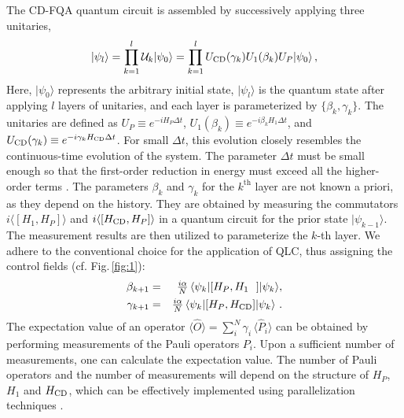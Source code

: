 \documentclass[twocolumn,aps,superscriptaddress,floatfix,longbibliography]{revtex4-2}
\newcommand{\la}{\langle}
\newcommand{\ra}{\rangle}
\newcommand{\awc}[1]{{\color[rgb]{.8,.6,.6}{[AW: {\it #1}\,]}}}
\newcommand{\Fig}[1]{Fig.\,\ref{fig:#1}}
\begin{document}
The CD-FQA quantum circuit is assembled by successively applying
three unitaries,
\begin{equation}
   |\psi_{l}\rangle
   =\prod_{k=1}^l {\cal U}_k|\psi_{0}\rangle
   =\prod_{k=1}^l U_{\rm CD}(\gamma_k) U_1(\beta_k)  U_{P}|\psi_{0}\rangle
\,,\label{Falqon-1}
\end{equation}
Here, $|\psi_{0}\rangle$ represents the arbitrary initial state,
$|\psi_{l}\rangle$ is the quantum state after applying $l$
layers of unitaries, and each layer is parameterized by
$\{\beta_k,\gamma_k\}$. The unitaries are defined as $U_{P}\equiv
e^{-iH_{P}\Delta t}$, $U_{1}(\beta_{k})\equiv
e^{-i\beta_{k}H_{1}\Delta t}$, and $U_{\rm CD}(\gamma_{k})\equiv
e^{-i\gamma_{k}H_{\rm CD}\Delta t}$. For small $\Delta t$, this
evolution closely resembles the
continuous-time evolution of the system. The parameter $\Delta t$
must be small enough so that the first-order reduction in
energy must exceed all the higher-order terms
\cite{FeedbackPRA}. The parameters $\beta_{k}$ and $\gamma_{k}$
for the $k^{\text{th}}$ layer are not known a priori,
as they depend on the history. They are
obtained by measuring the commutators $i\langle [H_{1},
H_{P}]\rangle$ and $i \langle [H_{\rm CD}, H_{P}]\rangle $
in a quantum circuit for the prior state
$|\psi_{k-1}\rangle$. The measurement results are then utilized
to parameterize the $k$-th layer. We adhere to the conventional
choice for the application of QLC, thus assigning the control
fields (cf. \Fig{1}):
\begin{eqnarray}
   \beta _{k+1} &=& \tfrac{i\alpha}{N}\,\langle \psi_{k}|[H_{P}, H_{1}\ \ ]|\psi_{k}\rangle, \\
   \gamma_{k+1} &=& \tfrac{i\alpha}{N}\,\langle \psi_{k}|[H_{P}, H_{\rm CD}]|\psi_{k}\rangle
\text{ .}
\end{eqnarray}
The expectation
value of an operator $\langle {\hat O}\rangle=\sum_{i}^N\!
\gamma_i\, \la {\hat P}_{i}\ra$ can be obtained by performing
measurements of the Pauli operators $P_i$.  Upon a sufficient
number of measurements, one can calculate the expectation
value. The number of Pauli operators and the number of
measurements will depend on the structure of $H_P$, $H_1$ and
$H_{\rm CD}$, which can be effectively implemented using
parallelization techniques \cite{gokhale2019minimizing,
verteletskyi2020measurement, reggio2023fast, anastasiou2023really,
 zhu2023optimizing}. 
 
\end{document}
